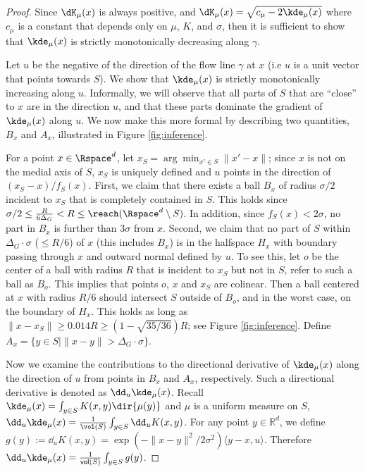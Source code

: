\documentclass[11pt]{myclass}
\begin{document}
\begin{proof}
Since $\dK_\mu(x)$ is always positive, and $\dK_\mu(x) = \sqrt{c_\mu - 2\kde_\mu(x)}$ where $c_\mu$ is a constant that depends only on $\mu$, $K$, and $\sigma$, then it is sufficient to show that $\kde_\mu(x)$ is strictly monotonically decreasing along $\gamma$.  

Let $u$ be the negative of the direction of the flow line $\gamma$ at $x$ (i.e $u$ is a unit vector that points towards $S$). We show that $\kde_\mu(x)$ is strictly monotonically increasing along $u$. 
Informally, we will observe that all parts of $S$ that are ``close'' to $x$ are in the direction $u$, and that these parts dominate the gradient of $\kde_\mu(x)$ along $u$.  
We now make this more formal by describing two quantities, $B_x$ and $A_x$, illustrated in Figure \ref{fig:inference}.  

For a point $x \in \Rspace^d$, let $x_S = \arg \min_{x' \in S} \|x'-x\|$; since $x$ is not on the medial axis of $S$, $x_S$ is uniquely defined and $u$ points in the direction of $(x_S - x)/f_S(x)$. 
First, we claim that there exists a ball $B_x$ of radius $\sigma/2$ incident to $x_S$ that is completely contained in $S$.
This holds since $\sigma/2 \leq \frac{R}{6\Delta_G} < R \leq \reach(\Rspace^d \setminus S)$. 
In addition, since $f_S(x) < 2\sigma$, no part in $B_x$ is further than $3 \sigma$ from $x$.
Second, we claim that no part of $S$ within $\Delta_G \cdot \sigma$ ($\leq R/6$)  of $x$ (this includes $B_x$) is in the halfspace $H_x$ with boundary passing through $x$ and outward normal defined by $u$.  
To see this, let $o$ be the center of a ball with radius $R$ that is incident to $x_S$ but not in $S$, refer to such a ball as $B_o$. This implies that points $o$, $x$ and $x_S$ are colinear. Then a ball centered at $x$ with radius $R/6$ should intersect $S$ outside of $B_o$, and in the worst case, on the boundary of $H_x$. 
This holds as long as $\|x-x_S\| \geq 0.014R \geq (1-\sqrt{35/36})R$; see Figure \ref{fig:inference}.  
Define $A_x = \{y \in S \mid \|x-y\| > \Delta_G \cdot \sigma\}$.    


Now we examine the contributions to the directional derivative of $\kde_\mu(x)$ along the direction of $u$ from points in $B_x$ and $A_x$, respectively. 
Such a directional derivative is denoted as $\dd_u \kde_\mu(x)$. 
Recall $\kde_\mu(x) = \int_{y \in S} K(x,y) \dir{\mu(y)}$ and $\mu$ is a uniform measure on $S$, $\dd_u \kde_\mu(x) = \frac{1}{\vol(S)} \int_{y \in S} \dd_u K(x,y)$. 
For any point $y \in \mathbb{R}^d$, we define  
$g(y) := \dd_u K(x,y) = \exp(-\|x-y\|^2/2\sigma^2) \langle y-x,u\rangle$. 
Therefore $\dd_u \kde_\mu(x) = \frac{1}{\textsf{vol}(S)} \int_{y \in S}  g(y)$. 


\end{proof}
\end{document}
